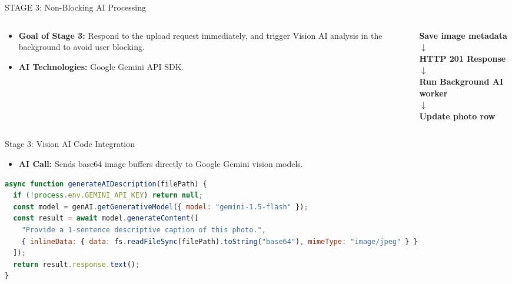 \documentclass[aspectratio=169]{beamer}
\begin{document}
\begin{frame}{STAGE 3: Non-Blocking AI Processing}
  \begin{columns}
    \begin{column}{0.6\textwidth}
      \begin{itemize}
        \item \textbf{Goal of Stage 3:} Respond to the upload request immediately, and trigger Vision AI analysis in the background to avoid user blocking.
        \item \textbf{AI Technologies:} Google Gemini API SDK.
      \end{itemize}
    \end{column}
    \begin{column}{0.4\textwidth}
      \begin{center}
        \textbf{Save image metadata} \\
        $\downarrow$ \\
        \textbf{HTTP 201 Response} \\
        $\downarrow$ \\
        \textbf{Run Background AI worker} \\
        $\downarrow$ \\
        \textbf{Update photo row}
      \end{center}
    \end{column}
  \end{columns}
\end{frame}

\begin{frame}[fragile]{Stage 3: Vision AI Code Integration}
  \begin{itemize}
    \item \textbf{AI Call:} Sends base64 image buffers directly to Google Gemini vision models.
  \end{itemize}
\begin{lstlisting}[language=JavaScript]
async function generateAIDescription(filePath) {
  if (!process.env.GEMINI_API_KEY) return null;
  const model = genAI.getGenerativeModel({ model: "gemini-1.5-flash" });
  const result = await model.generateContent([
    "Provide a 1-sentence descriptive caption of this photo.",
    { inlineData: { data: fs.readFileSync(filePath).toString("base64"), mimeType: "image/jpeg" } }
  ]);
  return result.response.text();
}
\end{lstlisting}
\end{frame}
\end{document}
